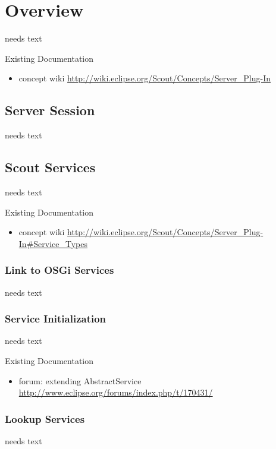 \documentclass[a4paper,10pt,twoside]{book}
\begin{document}
  \sloppy
\fi


\chapter{Overview}
needs text

\noindent Existing Documentation
\begin{itemize}
  \item concept wiki \url{http://wiki.eclipse.org/Scout/Concepts/Server_Plug-In}
\end{itemize}

\section{Server Session}
needs text

\section{Scout Services}
needs text

\noindent Existing Documentation
\begin{itemize}
  \item concept wiki \url{http://wiki.eclipse.org/Scout/Concepts/Server_Plug-In#Service_Types}
\end{itemize}

\subsection{Link to OSGi Services}
needs text

\subsection{Service Initialization}
needs text

\noindent Existing Documentation
\begin{itemize}
  \item forum: extending AbstractService \url{http://www.eclipse.org/forums/index.php/t/170431/}
\end{itemize}

\subsection{Lookup Services}
needs text
\end{document}
